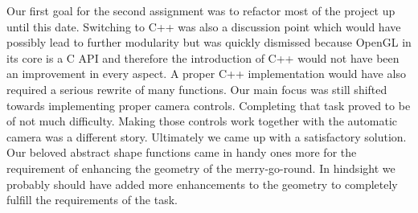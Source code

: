 \documentclass{report}
\begin{document}
Our first goal for the second assignment was to refactor most of the project up until this date. Switching to C++ was also a discussion point which would have possibly lead to further modularity but was quickly dismissed because OpenGL in its core is a C API and therefore the introduction of C++ would not have been an improvement in every aspect. A proper C++ implementation would have also required a serious rewrite of many functions. Our main focus was still shifted towards implementing proper camera controls. Completing that task proved to be of not much difficulty. Making those controls work together with the automatic camera was a different story. Ultimately we came up with a satisfactory solution. Our beloved abstract shape functions came in handy ones more for the requirement of enhancing the geometry of the merry-go-round. In hindsight we probably should have added more enhancements to the geometry to completely fulfill the requirements of the task.
\end{document}
